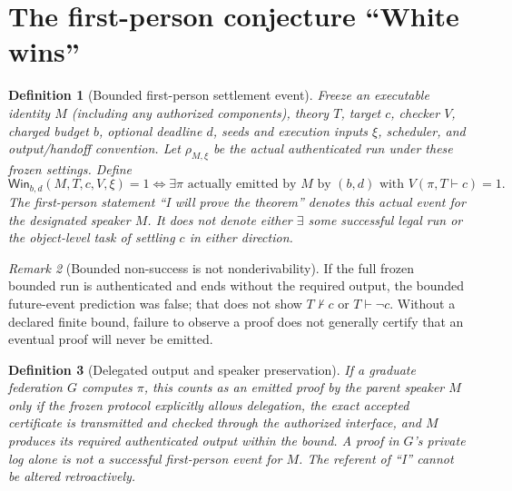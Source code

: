 \documentclass[11pt,letterpaper]{article}
\newtheorem{definition}{Definition}[section]
\theoremstyle{remark}
\newtheorem{remark}[definition]{Remark}
\newcommand{\Win}{\mathsf{Win}}
\begin{document}
\section{The first-person conjecture ``White wins''}
\begin{definition}[Bounded first-person settlement event]\label{def:actual}
Freeze an executable identity $M$ (including any authorized components), theory $T$, target $c$, checker $V$, charged budget $b$, optional deadline $d$, seeds and execution inputs $\xi$, scheduler, and output/handoff convention. Let $\rho_{M,\xi}$ be the \emph{actual authenticated run} under these frozen settings. Define
\[\Win_{b,d}(M,T,c,V,\xi)=1\iff\exists\pi\text{ actually emitted by }M\text{ by }(b,d)\text{ with }V(\pi,T\vdash c)=1.\]
The first-person statement ``I will prove the theorem'' denotes this actual event for the designated speaker $M$. It does not denote either $\exists$ some successful legal run or the object-level task of settling $c$ in either direction.
\end{definition}
\begin{remark}[Bounded non-success is not nonderivability]
If the full frozen bounded run is authenticated and ends without the required output, the bounded future-event prediction was false; that does not show $T\nvdash c$ or $T\vdash\neg c$. Without a declared finite bound, failure to observe a proof does not generally certify that an eventual proof will never be emitted.
\end{remark}
\begin{definition}[Delegated output and speaker preservation]\label{def:handoff}
If a graduate federation $G$ computes $\pi$, this counts as an emitted proof by the parent speaker $M$ \emph{only if} the frozen protocol explicitly allows delegation, the exact accepted certificate is transmitted and checked through the authorized interface, and $M$ produces its required authenticated output within the bound. A proof in $G$'s private log alone is not a successful first-person event for $M$. The referent of ``I'' cannot be altered retroactively.
\end{definition}
\end{document}
